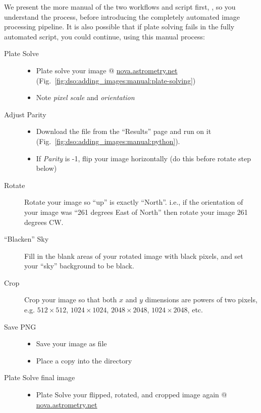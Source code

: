 We present the more manual of the two workflows and script first,
, so you understand the process, before
introducing the completely automated image processing pipeline. It is
also possible that if plate solving fails in the fully automated
script, you could continue, using this  manual process:

\begin{description}
\item[Plate Solve]\mbox{}
  \begin{itemize}
  \item Plate solve your image @ \url{nova.astrometry.net} (Fig.~\ref{fig:dso:adding_images:manual:plate-solving})
  \item Note \emph{pixel scale} and \emph{orientation}
  \end{itemize}
\item[Adjust Parity]\mbox{}
  \begin{itemize}
  \item Download the  file from the ``Results'' page and run  on it (Fig.~\ref{fig:dso:adding_images:manual:python}).
  \item If \emph{Parity} is -1, flip your image horizontally (do this before rotate step below)
  \end{itemize}
\item[Rotate]
  Rotate your image so ``up'' is exactly ``North''. i.e., if the orientation of your image was ``261 degrees East of North'' then rotate your image 261 degrees CW.
\item[``Blacken'' Sky]
  Fill in the blank areas of your rotated image with black pixels, and set your ``sky'' background to be black.
\item[Crop]
  Crop your image so that both $x$ and $y$ dimensions are powers of two pixels, e.g. $512\times512$, $1024\times1024$, $2048\times2048$, $1024\times2048$, etc.
\item[Save PNG]\mbox{}
  \begin{itemize}
  \item Save your image as  file
  \item Place a copy into the  directory
  \end{itemize}
\item[Plate Solve final image]\mbox{}
  \begin{itemize}
  \item Plate Solve your flipped, rotated, and cropped image again @ \url{nova.astrometry.net}

\end{itemize}
\end{description}
